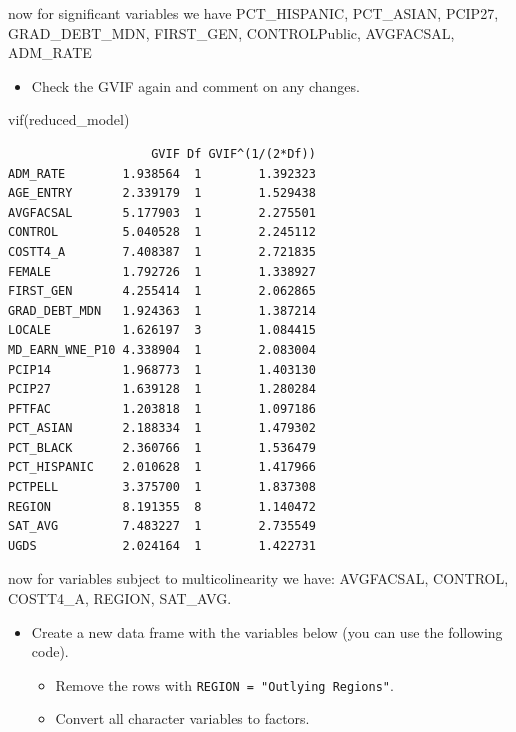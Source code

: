 \documentclass[
  letterpaper,
  DIV=11,
  numbers=noendperiod]{scrartcl}
\newenvironment{Shaded}{\begin{snugshade}}{\end{snugshade}}
\newcommand{\FunctionTok}[1]{\textcolor[rgb]{0.28,0.35,0.67}{#1}}
\newcommand{\NormalTok}[1]{\textcolor[rgb]{0.00,0.23,0.31}{#1}}
\providecommand{\tightlist}{%
  \setlength{\itemsep}{0pt}\setlength{\parskip}{0pt}}\usepackage{longtable,booktabs,array}
\begin{document}
now for significant variables we have PCT\_HISPANIC, PCT\_ASIAN, PCIP27,
GRAD\_DEBT\_MDN, FIRST\_GEN, CONTROLPublic, AVGFACSAL, ADM\_RATE

\begin{itemize}
\tightlist
\item
  Check the GVIF again and comment on any changes.
\end{itemize}

\begin{Shaded}
\begin{Highlighting}[]
\FunctionTok{vif}\NormalTok{(reduced\_model)}
\end{Highlighting}
\end{Shaded}

\begin{verbatim}
                    GVIF Df GVIF^(1/(2*Df))
ADM_RATE        1.938564  1        1.392323
AGE_ENTRY       2.339179  1        1.529438
AVGFACSAL       5.177903  1        2.275501
CONTROL         5.040528  1        2.245112
COSTT4_A        7.408387  1        2.721835
FEMALE          1.792726  1        1.338927
FIRST_GEN       4.255414  1        2.062865
GRAD_DEBT_MDN   1.924363  1        1.387214
LOCALE          1.626197  3        1.084415
MD_EARN_WNE_P10 4.338904  1        2.083004
PCIP14          1.968773  1        1.403130
PCIP27          1.639128  1        1.280284
PFTFAC          1.203818  1        1.097186
PCT_ASIAN       2.188334  1        1.479302
PCT_BLACK       2.360766  1        1.536479
PCT_HISPANIC    2.010628  1        1.417966
PCTPELL         3.375700  1        1.837308
REGION          8.191355  8        1.140472
SAT_AVG         7.483227  1        2.735549
UGDS            2.024164  1        1.422731
\end{verbatim}

now for variables subject to multicolinearity we have: AVGFACSAL,
CONTROL, COSTT4\_A, REGION, SAT\_AVG.

\begin{itemize}
\tightlist
\item
  Create a new data frame with the variables below (you can use the
  following code).

  \begin{itemize}
  \tightlist
  \item
    Remove the rows with \texttt{REGION\ =\ "Outlying\ Regions"}.
  \item
    Convert all character variables to factors.
  \end{itemize}
\end{itemize}
\end{document}
